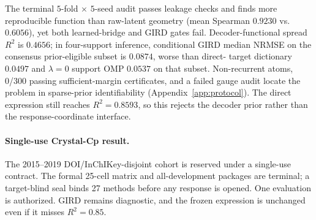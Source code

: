 The terminal $5$-fold $\times$ $5$-seed audit passes leakage checks and finds
more reproducible function than raw-latent geometry (mean Spearman $0.9230$ vs.
$0.6056$), yet both learned-bridge and GIRD gates fail.  Decoder-functional
spread $R^2$ is $0.4656$; in four-support inference, conditional GIRD median
NRMSE on the consensus prior-eligible subset is $0.0874$, worse than direct-
target dictionary $0.0497$ and $\lambda=0$ support OMP $0.0537$ on that subset.
Non-recurrent atoms, 0/300 passing sufficient-margin
certificates, and a failed gauge audit locate the problem in sparse-prior
identifiability (Appendix~\ref{app:protocol}).  The direct expression still
reaches $R^2=0.8593$, so this rejects the decoder prior rather than the
response-coordinate interface.

\paragraph{Single-use Crystal-Cp result.}
The 2015--2019 DOI/InChIKey-disjoint cohort is reserved under a single-use
contract.  The formal 25-cell matrix and all-development packages are terminal;
a target-blind seal binds 27 methods before any response is opened.  One
evaluation is authorized.  GIRD remains diagnostic, and the frozen expression
is unchanged even if it misses $R^2=0.85$.
